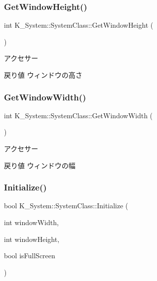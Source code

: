 \subsubsection{\texorpdfstring{Get\+Window\+Height()}{GetWindowHeight()}}
{\footnotesize\ttfamily int K\+\_\+\+System\+::\+System\+Class\+::\+Get\+Window\+Height (\begin{DoxyParamCaption}{ }\end{DoxyParamCaption})}



アクセサー 

\begin{DoxyReturn}{戻り値}
ウィンドウの高さ 
\end{DoxyReturn}
\mbox{\label{class_k___system_1_1_system_class_a8b1226fbf696428544adfa890430cac1}} 
\subsubsection{\texorpdfstring{Get\+Window\+Width()}{GetWindowWidth()}}
{\footnotesize\ttfamily int K\+\_\+\+System\+::\+System\+Class\+::\+Get\+Window\+Width (\begin{DoxyParamCaption}{ }\end{DoxyParamCaption})}



アクセサー 

\begin{DoxyReturn}{戻り値}
ウィンドウの幅 
\end{DoxyReturn}
\mbox{\label{class_k___system_1_1_system_class_a2db013b3b45f150df5355fd5265c8705}} 
\subsubsection{\texorpdfstring{Initialize()}{Initialize()}}
{\footnotesize\ttfamily bool K\+\_\+\+System\+::\+System\+Class\+::\+Initialize (\begin{DoxyParamCaption}\item[{int}]{window\+Width,  }\item[{int}]{window\+Height,  }\item[{bool}]{is\+Full\+Screen }\end{DoxyParamCaption})}



